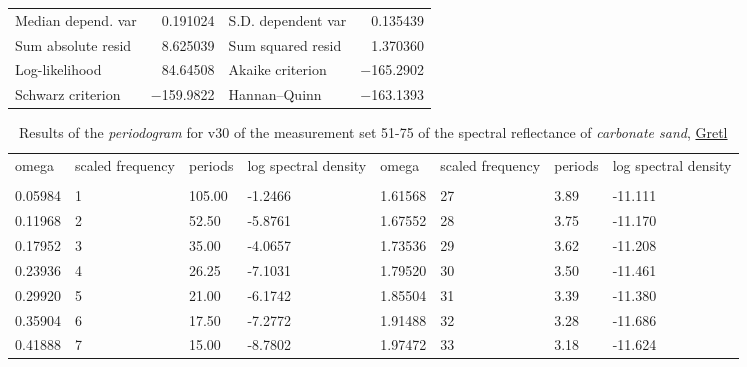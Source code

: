 \documentclass[10pt, a4paper]{article}
\begin{document}
\begin{appendices}
\begin{table}[H]
\begin{center}
\vspace{1ex}
	\begin{tabular}{lrlr}
		Median depend. var &  0.191024 & S.D. dependent var &  0.135439 \\
		Sum absolute resid &  8.625039 & Sum squared resid &  1.370360 \\
		Log-likelihood &  84.64508 & Akaike criterion & $-$165.2902 \\
		Schwarz criterion & $-$159.9822 & Hannan--Quinn & $-$163.1393 \\ \hline \hline
	\end{tabular}
	\end{center}
\label{tab:29}
\end{table}
\pagebreak

\begin{table}[H]
	\begin{small}
	\caption{Results of the \textit{periodogram} for v30 of the measurement set 51-75 of the spectral reflectance of \textit{carbonate sand}, \href{http://gretl.sourceforge.net/}{Gretl}}
	\label{tab:30}
	\begin{center}
	\begin{tabular}{|p{15mm} p{15mm} p{15mm} p{15mm} || p{15mm} p{15mm}p{15mm} p{15mm}|}
		omega & scaled frequency & periods & log spectral density & omega & scaled frequency & periods & log spectral density \\ \\ \hline\hline
		0.05984      & 1    &      105.00  &      -1.2466  &  1.61568   &   27    &        3.89     &    -11.111\\ 
		 0.11968     &  2   &        52.50   &      -5.8761 &   1.67552   &   28    &        3.75     &    -11.170\\ 
		 0.17952     &  3   &        35.00   &      -4.0657 &  1.73536   &   29    &        3.62     &    -11.208\\ 
		 0.23936     &  4   &        26.25   &      -7.1031 &  1.79520   &   30    &        3.50     &    -11.461\\ 
		 0.29920     &  5   &        21.00   &      -6.1742 &  1.85504   &   31    &        3.39     &    -11.380\\ 
		 0.35904     &  6   &        17.50   &      -7.2772  & 1.91488    & 32     &       3.28      &   -11.686\\ 
		 0.41888     &  7     &      15.00   &      -8.7802 &  1.97472    &  33    &        3.18     &    -11.624\\ 

\end{tabular}
\end{center}
\end{small}
\end{table}
\end{appendices}
\end{document}
